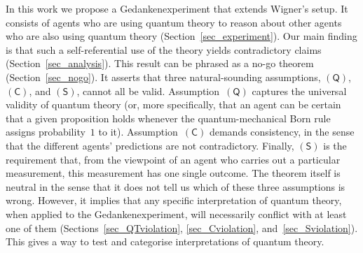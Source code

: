 \documentclass{article}
\theoremstyle{mystyle}
\theoremstyle{definition}
\newcommand*{\QT}{\mathsf{(Q)}}
\newcommand*{\SW}{\mathsf{(S)}}
\newcommand*{\SelfCons}{\mathsf{(C)}}
\begin{document}
In this work we propose a Gedankenexperiment that extends Wigner's setup. It consists of agents who are using quantum theory to reason about other agents who are also using quantum theory (Section~\ref{sec_experiment}). Our main finding is that such a self-referential use of the theory yields contradictory claims (Section~\ref{sec_analysis}). This result can be phrased as a no-go theorem (Section~\ref{sec_nogo}). It asserts that three natural-sounding assumptions, $\QT$, $\SelfCons$, and $\SW$, cannot all be valid.  Assumption~$\QT$ captures the universal validity of quantum theory (or, more specifically, that an agent can be certain that a given proposition holds whenever the quantum-mechanical Born rule assigns probability~$1$ to it).  Assumption~$\SelfCons$ demands consistency, in the sense that the different agents' predictions are not contradictory. Finally, $\SW$ is the requirement that, from  the viewpoint of an agent who carries out a particular measurement, this measurement has one single outcome. The  theorem itself is neutral in the sense that it does not tell us which of these three assumptions is wrong. However, it implies that any specific interpretation of quantum theory, when applied to the Gedankenexperiment, will necessarily conflict with at least one of them (Sections~\ref{sec_QTviolation}, \ref{sec_Cviolation}, and~\ref{sec_Sviolation}). This gives a way to test and categorise interpretations of quantum theory.
 
\end{document}

